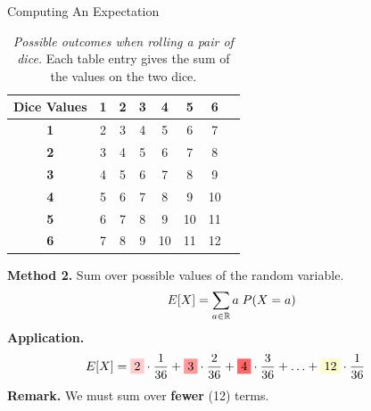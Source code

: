 \documentclass[10pt]{beamer}
\begin{document}
\begin{frame}{Computing An Expectation}
\footnotesize  
\begin{table}
\caption{\textit{Possible outcomes when rolling a pair of dice.} Each table entry gives the sum of the values on the two dice.}	
\begin{tabular}{|c|c|c|c|c|c|c|c|}
\hline
\textbf{Dice Values} & \textbf{1} & \textbf{2} & \textbf{3} & \textbf{4} & \textbf{5} & \textbf{6} \\
\hline
\textbf{1} & \cellcolor{red!20} 2  & \cellcolor{red!40} 3  & \cellcolor{red!60} 4  & \cellcolor{red!80} 5  & \cellcolor{red!90} 6  & \cellcolor{red!100} 7 \\
\hline
\textbf{2} & \cellcolor{red!40} 3  & \cellcolor{red!60} 4  & \cellcolor{red!80} 5  & \cellcolor{red!90} 6  & \cellcolor{red!100} 7  & \cellcolor{orange!80} 8 \\
\hline
\textbf{3} & \cellcolor{red!60} 4  & \cellcolor{red!80} 5  & \cellcolor{red!90} 6  & \cellcolor{red!100} 7  & \cellcolor{orange!80} 8  & \cellcolor{orange!60} 9 \\
\hline
\textbf{4} & \cellcolor{red!80} 5  & \cellcolor{red!90} 6  & \cellcolor{red!100} 7  & \cellcolor{orange!80} 8  & \cellcolor{orange!60} 9  & \cellcolor{orange!40} 10 \\
\hline
\textbf{5} & \cellcolor{red!90} 6  & \cellcolor{red!100} 7  & \cellcolor{orange!80} 8  & \cellcolor{orange!60} 9  & \cellcolor{orange!40} 10 & \cellcolor{orange!20} 11 \\
\hline
\textbf{6} & \cellcolor{red!100} 7 & \cellcolor{orange!80} 8 & \cellcolor{orange!60} 9 & \cellcolor{orange!40} 10 & \cellcolor{orange!20} 11 & \cellcolor{yellow!20} 12 \\
\hline
\end{tabular}
\end{table}

\vfill 

\colorbox{blue!30}{\textbf{Method 2.}} \pause  Sum over possible values of the random variable.
\[ E[X] = \sum_{a \in \mathbb{R}} a \; P(X=a) \]
\vfill 
\pause 
\colorbox{blue!30}{\textbf{Application.}}
\begin{align*}
 E[X] &= \colorbox{red!20}{2} \cdot \frac{1}{36} + \colorbox{red!40}{3} \cdot \frac{2}{36}  +\colorbox{red!60}{4} \cdot \frac{3}{36}  +\hdots + 
  \colorbox{yellow!20}{12} \cdot \frac{1}{36} 
\end{align*}
\vfill 
\pause 
\colorbox{blue!30}{\textbf{Remark.}} \; We must sum over \textbf{fewer} (12) terms.
\end{frame}
\end{document}

